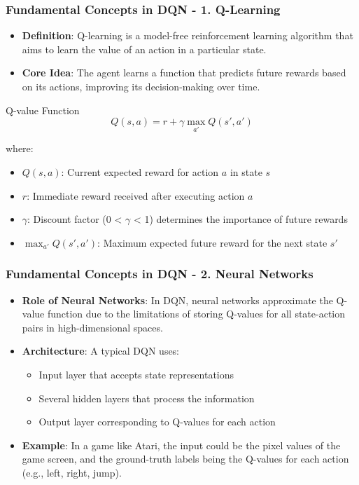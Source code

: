 \documentclass[aspectratio=169]{beamer}
\begin{document}
\begin{frame}[fragile]
    \frametitle{Fundamental Concepts in DQN - 1. Q-Learning}
    \begin{itemize}
        \item \textbf{Definition}: Q-learning is a model-free reinforcement learning algorithm that aims to learn the value of an action in a particular state.
        \item \textbf{Core Idea}: The agent learns a function that predicts future rewards based on its actions, improving its decision-making over time.
    \end{itemize}

    \begin{block}{Q-value Function}
        \[
        Q(s, a) = r + \gamma \max_{a'} Q(s', a')
        \]
    \end{block}
    
    where:
    \begin{itemize}
        \item \(Q(s, a)\): Current expected reward for action \(a\) in state \(s\)
        \item \(r\): Immediate reward received after executing action \(a\)
        \item \(\gamma\): Discount factor (0 < $\gamma$ < 1) determines the importance of future rewards
        \item \(\max_{a'} Q(s', a')\): Maximum expected future reward for the next state \(s'\)
    \end{itemize}
\end{frame}

\begin{frame}[fragile]
    \frametitle{Fundamental Concepts in DQN - 2. Neural Networks}
    \begin{itemize}
        \item \textbf{Role of Neural Networks}: In DQN, neural networks approximate the Q-value function due to the limitations of storing Q-values for all state-action pairs in high-dimensional spaces.
        \item \textbf{Architecture}: A typical DQN uses:
        \begin{itemize}
            \item Input layer that accepts state representations
            \item Several hidden layers that process the information
            \item Output layer corresponding to Q-values for each action
        \end{itemize}
        \item \textbf{Example}: In a game like Atari, the input could be the pixel values of the game screen, and the ground-truth labels being the Q-values for each action (e.g., left, right, jump).
    \end{itemize}
\end{frame}
\end{document}
